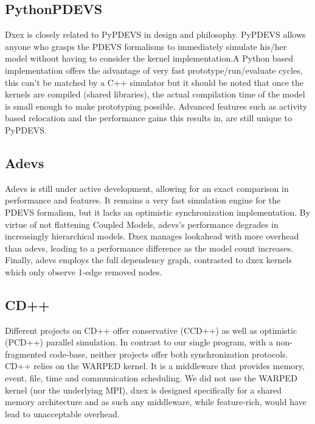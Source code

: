 \subsection{PythonPDEVS}
Dxex is closely related to PyPDEVS in design and philosophy. PyPDEVS allows anyone who grasps the PDEVS formalisms to immediately simulate his/her model without having to consider the kernel implementation.A Python based implementation offers the advantage of very fast prototype/run/evaluate cycles, this can't be matched by a C++ simulator but it should be noted that once the kernels are compiled (shared libraries), the actual compilation time of the model is small enough to make prototyping possible.
Advanced features such as activity based relocation and the performance gains this results in, are still unique to PyPDEVS.
\subsection{Adevs}
Adevs is still under active development, allowing for an exact comparison in performance and features. It remains a very fast simulation engine for the PDEVS formalism, but it lacks an optimistic synchronization implementation. %
By virtue of not flattening Coupled Models, adevs's performance degrades in increasingly hierarchical models. Dxex manages lookahead with more overhead than adevs, leading to a performance difference as the model count increases. Finally, adevs employs the full dependency graph, contrasted to dxex kernels which only observe 1-edge removed nodes. 
\subsection{CD++}
Different projects on CD++ offer conservative (CCD++) as well as optimistic (PCD++) parallel simulation. In contrast to our single program, with a non-fragmented code-base, neither projects offer both synchronization protocols. CD++ relies on the WARPED kernel. It is a middleware that provides memory, event, file, time and communication scheduling. We did not use the WARPED kernel (nor the underlying MPI), dxex is designed specifically for a shared memory architecture and as such any middleware, while feature-rich, would have lead to unacceptable overhead.
